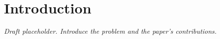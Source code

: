 \section{Introduction}
\label{sec:introduction}
\emph{Draft placeholder. Introduce the problem and the paper's contributions.}
